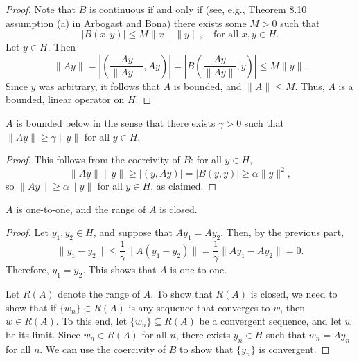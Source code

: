 \documentclass{homework}
\begin{document}
\begin{arabicparts}
\begin{proof}
			Note that $B$ is continuous if and only if (see, e.g., Theorem 8.10 assumption (a) in Arbogast and Bona) there exists some $M > 0$ such that
			\begin{equation}
				|B(x,y)| \le M\lVert x\rVert \lVert y\rVert, \quad \text{for all } x, y\in H.
			\end{equation}
			Let $y \in H$. Then
			\begin{equation}
				\lVert Ay\rVert = \left|\left(\frac{Ay}{\lVert Ay\rVert}, Ay\right)\right|=\left|B\left(\frac{Ay}{\lVert Ay\rVert},y \right)\right| \le M \lVert y\rVert.
			\end{equation}
			Since $y$ was arbitrary, it follows that $A$ is bounded, and $\lVert A \rVert \le M$. Thus, $A$ is a bounded, linear operator on $H$.
		\end{proof}
		
		\questionpart
		$A$ is bounded below in the sense that there exists $\gamma > 0$ such that $\lVert A y\rVert \ge \gamma \lVert y\rVert$ for all $y \in H$.
		\begin{proof}
			This follows from the coercivity of $B$: for all $y \in H$,
			\begin{equation}
				\lVert Ay\rVert \lVert y\rVert \ge |(y, Ay)| = |B(y, y)| \ge \alpha \lVert y \rVert^2,
			\end{equation}
			so $\lVert Ay\rVert \ge \alpha \lVert y\rVert$ for all $y \in H$, as claimed.
		\end{proof}
		
		\questionpart
		$A$ is one-to-one, and the range of $A$ is closed.
		\begin{proof}
			Let $y_1, y_2 \in H$, and suppose that $Ay_1 = Ay_2$. Then, by the previous part,
			\begin{equation}
				\lVert y_1 - y_2\rVert \le \frac{1}{\gamma}\lVert A(y_1 - y_2)\rVert = \frac{1}{\gamma}\lVert Ay_1 - Ay_2\rVert = 0.
			\end{equation}
			Therefore, $y_1 = y_2$. This shows that $A$ is one-to-one.
			
			Let $R(A)$ denote the range of $A$. To show that $R(A)$ is closed, we need to show that if $\{w_n\} \subset R(A)$ is any sequence that converges to $w$, then $w\in R(A)$. To this end, let $\{w_n\} \subseteq R(A)$ be a convergent sequence, and let $w$ be its limit. Since $w_n \in R(A)$ for all $n$, there exists $y_n \in H$ such that $w_n = Ay_n$ for all $n$. We can use the coercivity of $B$ to show that $\{y_n\}$ is convergent.
			

\end{proof}
\end{arabicparts}
\end{document}
